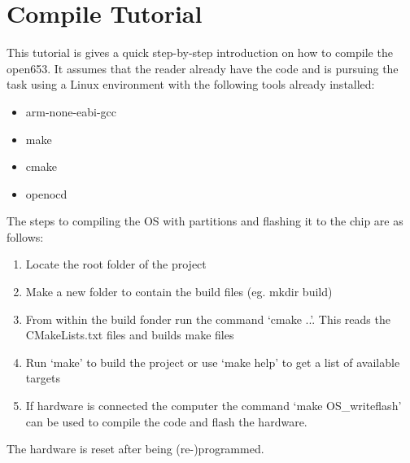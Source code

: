\chapter{Compile Tutorial}
\label{app:tutorial}
This tutorial is gives a quick step-by-step introduction on how to compile the open653.
It assumes that the reader already have the code and is pursuing the task using a Linux environment
with the following tools already installed:

\begin{itemize}
	\item arm-none-eabi-gcc
	\item make
	\item cmake
	\item openocd
\end{itemize}

The steps to compiling the OS with partitions and
flashing it to the chip are as follows:

\begin{enumerate}
	\item Locate the root folder of the project
	\item Make a new folder to contain the build files (eg. mkdir build)
	\item From within the build fonder run the command `cmake ..'.
		This reads the CMakeLists.txt files and builds make files
	\item Run `make' to build the project or use `make help' to get a list of available targets
	\item If hardware is connected the computer the command `make OS_writeflash'
		can be used to compile the code and flash the hardware.
\end{enumerate}

The hardware is reset after being (re-)programmed.
